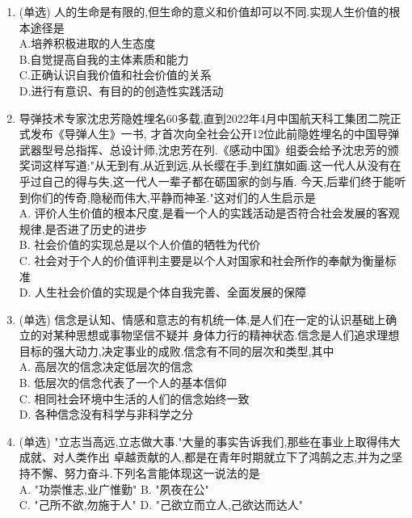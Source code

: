 \documentclass[12pt, a4paper, oneside, UTF8]{ctexbook}
\begin{document}
\begin{enumerate}
    \item (单选) 人的生命是有限的,但生命的意义和价值却可以不同.实现人生价值的根本途径是  \\
    A.培养积极进取的人生态度   \\
    B.自觉提高自我的主体素质和能力   \\
    C.正确认识自我价值和社会价值的关系  \\ 
    D.进行有意识、有目的的创造性实践活动  

    \item 导弹技术专家沈忠芳隐姓埋名60多载,直到2022年4月中国航天科工集团二院正式发布《导弹人生》一书,
    才首次向全社会公开12位此前隐姓埋名的中国导弹武器型号总指挥、总设计师,沈忠芳在列.《感动中国》组委会给予沈忠芳的颁奖词这样写道:"从无到有,从近到远,从长缨在手,到红旗如画.这一代人从没有在乎过自己的得与失,这一代人一辈子都在砺国家的剑与盾.
    今天,后辈们终于能听到你们的传奇,隐秘而伟大,平静而神圣."这对们的人生启示是 \\
    A. 评价人生价值的根本尺度,是看一个人的实践活动是否符合社会发展的客观规律,是否进了历史的进步 \\
    B. 社会价值的实现总是以个人价值的牺牲为代价 \\
    C. 社会对于个人的价值评判主要是以个人对国家和社会所作的奉献为衡量标准 \\
    D. 人生社会价值的实现是个体自我完善、全面发展的保障

    \item (单选) 信念是认知、情感和意志的有机统一体,是人们在一定的认识基础上确立的对某种思想或事物坚信不疑并
    身体力行的精神状态.信念是人们追求理想目标的强大动力,决定事业的成败.信念有不同的层次和类型,其中 \\
    A. 高层次的信念决定低层次的信念   \\
    B. 低层次的信念代表了一个人的基本信仰   \\
    C. 相同社会环境中生活的人们的信念始终一致   \\
    D. 各种信念没有科学与非科学之分 

    \item (单选) "立志当高远,立志做大事."大量的事实告诉我们,那些在事业上取得伟大成就、对人类作出
    卓越贡献的人,都是在青年时期就立下了鸿鹄之志,并为之坚持不懈、努力奋斗.下列名言能体现这一说法的是 \\
    A. "功崇惟志,业广惟勤" \qquad
    B. "夙夜在公" \\
    C. "己所不欲,勿施于人" \qquad
    D. "己欲立而立人,己欲达而达人"


\end{enumerate}
\end{document}
